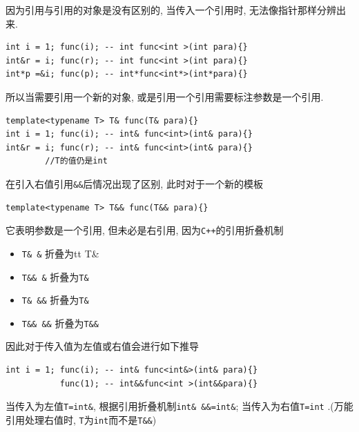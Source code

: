 \begin{paracol}{2}
	\begin{leftcolumn}
		因为引用与引用的对象是没有区别的, 当传入一个引用时, 无法像指针那样分辨出来.
	\end{leftcolumn}
	\begin{rightcolumn}
		\begin{lstlisting}[xleftmargin=1em]
int i = 1; func(i); -- int func<int >(int para){} 
int&r = i; func(r); -- int func<int >(int para){}
int*p =&i; func(p); -- int*func<int*>(int*para){} 
		\end{lstlisting}
	\end{rightcolumn}
	\begin{leftcolumn*}
		所以当需要引用一个新的对象, 或是引用一个引用需要标注参数是一个引用.
	\end{leftcolumn*}
	\begin{rightcolumn}
		\begin{lstlisting}[xleftmargin=1em]
template<typename T> T& func(T& para){}
int i = 1; func(i); -- int& func<int>(int& para){}
int&r = i; func(r); -- int& func<int>(int& para){}
		//T的值仍是int
		\end{lstlisting}
	\end{rightcolumn}
\end{paracol}

在引入右值引用{\tt \&\&}后情况出现了区别, 此时对于一个新的模板
\begin{lstlisting}[xleftmargin=10em,xrightmargin=5em]
template<typename T> T&& func(T&& para){}
\end{lstlisting}

它表明参数是一个引用, 但未必是右引用, 因为{\tt C++}的引用折叠机制
\begin{itemize}
	\item {\tt T\&  \&} 折叠为{tt T\&}
	\item {\tt T\&\& \&} 折叠为{\tt T\&}
	\item {\tt T\&  \&\&} 折叠为{\tt T\&}
	\item {\tt T\&\& \&\&} 折叠为{\tt T\&\&}
\end{itemize}

因此对于传入值为左值或右值会进行如下推导
\begin{lstlisting}[xleftmargin=4em,xrightmargin=2em]
int i = 1; func(i); -- int& func<int&>(int& para){}
		   func(1); -- int&&func<int >(int&&para){}
\end{lstlisting}

当传入为左值{\tt T=int\&}, 根据引用折叠机制{\tt int\& \&\&=int\&}; 当传入为右值{\tt T=int}
.(万能引用处理右值时, {\tt T}为{\tt int}而不是{\tt T\&\&})


